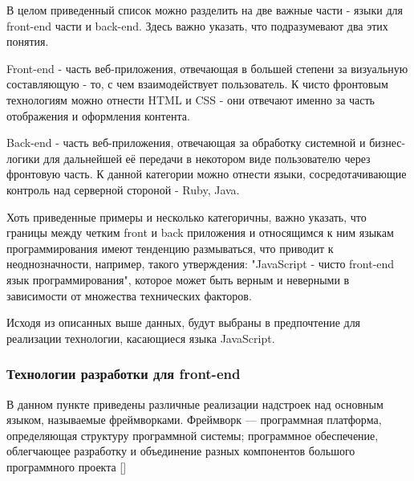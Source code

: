         В целом приведенный список можно разделить на две важные части - языки для front-end части и back-end.
        Здесь важно указать, что подразумевают два этих понятия.

        Front-end - часть веб-приложения, отвечающая в большей степени за визуальную составляющую - то, с чем взаимодействует пользователь.
        К чисто фронтовым технологиям можно отнести HTML и CSS - они отвечают именно за часть отображения и оформления контента.
        
        Back-end - часть веб-приложения, отвечающая за обработку системной и бизнес-логики для дальнейшей её передачи в некотором виде пользователю через фронтовую часть.
        К данной категории можно отнести языки, сосредотачивающие контроль над серверной стороной - Ruby, Java.

        Хоть приведенные примеры и несколько категоричны, важно указать, что границы между четким front и back приложения и относящимся к ним языкам программирования имеют тенденцию размываться, что приводит к неоднозначности, например, такого утверждения: "JavaScript - чисто front-end язык программирования", которое может быть верным и неверными в зависимости от множества технических факторов.

        Исходя из описанных выше данных, будут выбраны в предпочтение для реализации технологии, касающиеся языка JavaScript.

    \subsubsection{Технологии разработки для front-end}
        В данном пункте приведены различные реализации надстроек над основным языком, называемые фреймворками.
        Фреймворк — программная платформа, определяющая структуру программной системы; программное обеспечение, облегчающее разработку и объединение разных компонентов большого программного проекта [] %
        
